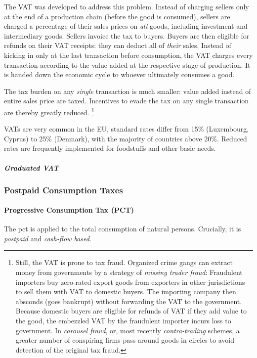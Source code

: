 The VAT was developed to address this problem.
Instead of charging sellers only at the end of a production chain (before the good is consumed), sellers are charged a percentage of their sales prices on \emph{all} goods, including investment and intermediary goods.
Sellers invoice the tax to buyers.
Buyers are then eligible for refunds on their VAT receipts:
they can deduct all of \emph{their} sales.
Instead of kicking in only at the last transaction before consumption, the VAT charges every transaction according to the value added at the respective stage of production.
It is handed down the economic cycle to whoever ultimately consumes a good.

The tax burden on any \emph{single} transaction is much smaller:
value added instead of entire sales price are taxed.
Incentives to evade the tax on any single transaction are thereby greatly reduced.
\footnote{
	Still, the VAT is prone to tax fraud.
	Organized crime gangs can extract money from governments by a strategy of \emph{missing trader fraud}:
	Fraudulent importers buy zero-rated export goods from exporters in other jurisdictions to sell them with VAT to domestic buyers.
	The importing company then absconds (goes bankrupt) without forwarding the VAT to the government.
	Because domestic buyers are eligible for refunds of VAT if they add value to the good, the embezzled VAT by the fraudulent importer incurs loss to government.
	In \emph{carousel fraud}, or, most recently \emph{contra-trading} schemes, a greater number of conspiring firms pass around goods in circles to avoid detection of the original tax fraud.
}

VATs are very common in the EU, standard rates differ from 15\% (Luxembourg, Cyprus) to 25\% (Denmark), with the majority of countries above 20\%.
Reduced rates are frequently implemented for foodstuffs and other basic needs.

\subparagraph{Graduated VAT}

\subsubsection{Postpaid Consumption Taxes}

\paragraph{Progressive Consumption Tax (PCT)}
	\label{sec:PCT}
 The \gls{pct} is applied to the total consumption of natural persons.
Crucially, it is \emph{postpaid} and \emph{cash-flow based}.

